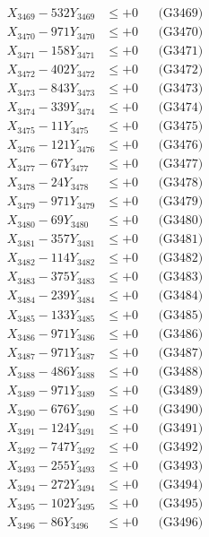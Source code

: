 \documentclass[a4paper,10pt]{article}
\begin{document}
{\begin{align}
X_{3469} - 532Y_{3469} &\leq +0 && \text{(G3469)} \\
X_{3470} - 971Y_{3470} &\leq +0 && \text{(G3470)} \\
\allowbreak
X_{3471} - 158Y_{3471} &\leq +0 && \text{(G3471)} \\
X_{3472} - 402Y_{3472} &\leq +0 && \text{(G3472)} \\
X_{3473} - 843Y_{3473} &\leq +0 && \text{(G3473)} \\
X_{3474} - 339Y_{3474} &\leq +0 && \text{(G3474)} \\
X_{3475} - 11Y_{3475} &\leq +0 && \text{(G3475)} \\
X_{3476} - 121Y_{3476} &\leq +0 && \text{(G3476)} \\
X_{3477} - 67Y_{3477} &\leq +0 && \text{(G3477)} \\
X_{3478} - 24Y_{3478} &\leq +0 && \text{(G3478)} \\
X_{3479} - 971Y_{3479} &\leq +0 && \text{(G3479)} \\
X_{3480} - 69Y_{3480} &\leq +0 && \text{(G3480)} \\
\allowbreak
X_{3481} - 357Y_{3481} &\leq +0 && \text{(G3481)} \\
X_{3482} - 114Y_{3482} &\leq +0 && \text{(G3482)} \\
X_{3483} - 375Y_{3483} &\leq +0 && \text{(G3483)} \\
X_{3484} - 239Y_{3484} &\leq +0 && \text{(G3484)} \\
X_{3485} - 133Y_{3485} &\leq +0 && \text{(G3485)} \\
X_{3486} - 971Y_{3486} &\leq +0 && \text{(G3486)} \\
X_{3487} - 971Y_{3487} &\leq +0 && \text{(G3487)} \\
X_{3488} - 486Y_{3488} &\leq +0 && \text{(G3488)} \\
X_{3489} - 971Y_{3489} &\leq +0 && \text{(G3489)} \\
X_{3490} - 676Y_{3490} &\leq +0 && \text{(G3490)} \\
\allowbreak
X_{3491} - 124Y_{3491} &\leq +0 && \text{(G3491)} \\
X_{3492} - 747Y_{3492} &\leq +0 && \text{(G3492)} \\
X_{3493} - 255Y_{3493} &\leq +0 && \text{(G3493)} \\
X_{3494} - 272Y_{3494} &\leq +0 && \text{(G3494)} \\
X_{3495} - 102Y_{3495} &\leq +0 && \text{(G3495)} \\
X_{3496} - 86Y_{3496} &\leq +0 && \text{(G3496)} \\

\end{align}}
\end{document}
